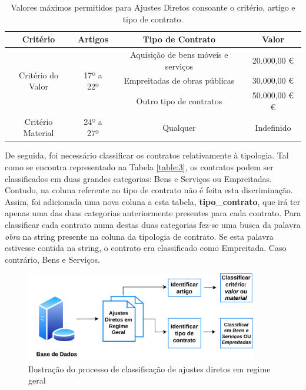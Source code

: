  \begin{table}[H]
 	\centering
 	\begin{tabular}{|c|c|c|c|}
 		\hline
 		\textbf{Critério}                  & \textbf{Artigos}           & \textbf{Tipo de Contrato}           & \textbf{Valor} \\ \hline
 		\multirow{3}{*}{Critério do Valor} & \multirow{3}{*}{17º a 22º} & Aquisição de bens móveis e serviços & 20.000,00 €         \\ \cline{3-4} 
 		&                            & Empreitadas de obras públicas       & 30.000,00 €        \\ \cline{3-4} 
 		&                            & Outro tipo de contratos             & 50.000,00 € €        \\ \hline
 		Critério Material                  & 24º a 27º                  & Qualquer                            & Indefinido     \\ \hline
 	\end{tabular}
 	\caption{Valores máximos permitidos para Ajustes Diretos consoante o critério, artigo e tipo de contrato.}
 \end{table}

De seguida, foi necessário classificar os contratos relativamente à tipologia. Tal como se encontra representado na Tabela \ref{table:3}, os contratos podem ser classificados em duas grandes categorias: Bens e Serviços ou Empreitadas. Contudo, na coluna referente ao tipo de contrato não é feita esta discriminação. Assim, foi adicionada uma nova coluna a esta tabela, \textbf{tipo\_contrato}, que irá ter apenas uma das duas categorias anteriormente presentes para cada contrato. Para classificar cada contrato numa destas duas categorias fez-se uma busca da palavra \textit{obra} na string presente na coluna da tipologia de contrato. Se esta palavra estivesse contida na string, o contrato era classificado como Empreitada. Caso contrário, Bens e Serviços. 


\begin{figure}[H]
	\centering
	\includegraphics[width=0.9\textwidth]{imagens/rf1.png}
	\caption{Ilustração do processo de classificação de ajustes diretos em regime geral}
	\label{}
\end{figure}





